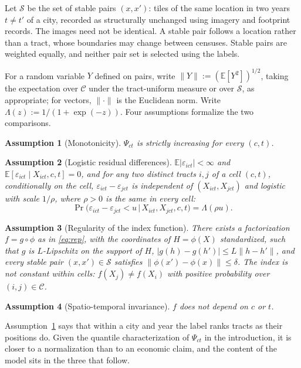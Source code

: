 \documentclass[11pt]{article}
\newtheorem{assumption}{Assumption}
\theoremstyle{remark}
\newcommand{\E}{\mathbb{E}}
\newcommand{\Cc}{\mathcal{C}}
\newcommand{\Ss}{\mathcal{S}}
\begin{document}
Let $\Ss$ be the set of stable pairs $(x,x')$: tiles of the same location in two years $t\ne t'$ of a city, recorded as structurally unchanged using imagery and footprint records. The images need not be identical. A stable pair follows a location rather than a tract, whose boundaries may change between censuses. Stable pairs are weighted equally, and neither pair set is selected using the labels.

For a random variable $Y$ defined on pairs, write $\|Y\|:=(\E[Y^2])^{1/2}$, taking the expectation over $\Cc$ under the tract-uniform measure or over $\Ss$, as appropriate; for vectors, $\|\cdot\|$ is the Euclidean norm. Write $\Lambda(z):=1/(1+\exp(-z))$. Four assumptions formalize the two comparisons.

\begin{assumption}[Monotonicity]\label{as:mono}
$\Psi_{ct}$ is strictly increasing for every $(c,t)$.
\end{assumption}
\vspace{-0.5em}
\begin{assumption}[Logistic residual differences]\label{as:meaninv}
$\E|\varepsilon_{ict}| < \infty$ and $\E[\varepsilon_{ict} \mid X_{ict}, c,t] = 0$, and for any two
distinct tracts $i,j$ of a cell $(c,t)$, conditionally on the cell, $\varepsilon_{ict}-\varepsilon_{jct}$
is independent of $(X_{ict}, X_{jct})$ and logistic with scale $1/\rho$, where $\rho>0$ is the same in
every cell:
\[
    \Pr\big(\varepsilon_{ict}-\varepsilon_{jct} < u \,\big|\, X_{ict}, X_{jct}, c, t\big) = \Lambda(\rho u).
\]
\end{assumption}
\vspace{-0.5em}
\begin{assumption}[Regularity of the index function]\label{as:lip}
There exists a factorization $f = g \circ \phi$ as in \eqref{eq:rep}, with the coordinates of
$H = \phi(X)$ standardized, such that $g$ is $L$-Lipschitz on the support of $H$,
$|g(h)-g(h')| \le L\|h-h'\|$, and every stable pair $(x,x')\in\Ss$ satisfies
$\|\phi(x')-\phi(x)\| \le \delta$. The index is not constant within cells: $f(X_j) \ne f(X_i)$ with
positive probability over $(i,j)\in\Cc$.
\end{assumption}
\vspace{-0.5em}
\begin{assumption}[Spatio-temporal invariance]\label{as:transport}
$f$ does not depend on $c$ or $t$.
\end{assumption}

Assumption~\ref{as:mono} says that within a city and year the label
ranks tracts as their positions do. Given the quantile characterization of $\Psi_{ct}$ in the
introduction, it is closer to a normalization than to an economic claim, and the content of the model
sits in the three that follow.
\end{document}
